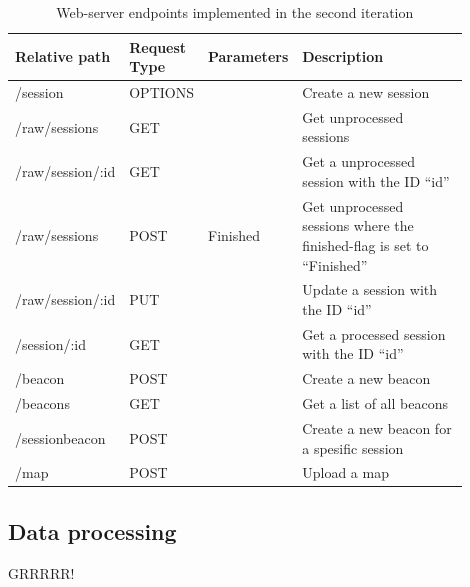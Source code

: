 \documentclass[../Main/thesis.tex]{subfiles}
\begin{document}
\begin{table}[h]
\caption{Web-server endpoints implemented in the second iteration}
\begin{tabular}{|p{0.2\linewidth}|p{0.15\linewidth}|p{0.15\linewidth}|p{0.4\linewidth}|}
\hline
\textbf{Relative path} & \textbf{Request Type} & \textbf{Parameters} & \textbf{Description}                                                    \\ \hline
/session               & OPTIONS               &                     & Create a new session                                                    \\ \hline
/raw/sessions          & GET                   &                     & Get unprocessed sessions                                                \\ \hline
/raw/session/:id        & GET                   &                     & Get a unprocessed session with the ID ``id''                            \\ \hline
/raw/sessions          & POST                  & Finished            & Get unprocessed sessions where the finished-flag is set to ``Finished'' \\ \hline
/raw/session/:id        & PUT                   &                     & Update a session with the ID ``id''                                     \\ \hline
/session/:id            & GET                   &                     & Get a processed session with the ID ``id''                              \\ \hline
/beacon                & POST                  &                     & Create a new beacon                                                     \\ \hline
/beacons               & GET                   &                     & Get a list of all beacons                                               \\ \hline
/sessionbeacon         & POST                  &                     & Create a new beacon for a spesific session                              \\ \hline
/map                   & POST                  &                     & Upload a map                                                            \\ \hline
\end{tabular}
\label{tab:endpoints-1}
\end{table}

\subsection{Data processing}
GRRRRR!
\end{document}
